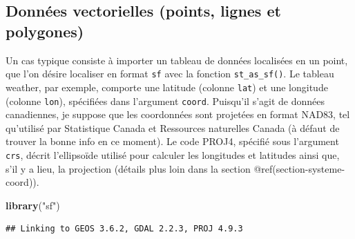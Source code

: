 \documentclass[]{book}
\newenvironment{Shaded}{\begin{snugshade}}{\end{snugshade}}
\newcommand{\DataTypeTok}[1]{\textcolor[rgb]{0.13,0.29,0.53}{#1}}
\newcommand{\KeywordTok}[1]{\textcolor[rgb]{0.13,0.29,0.53}{\textbf{#1}}}
\newcommand{\NormalTok}[1]{#1}
\newcommand{\OperatorTok}[1]{\textcolor[rgb]{0.81,0.36,0.00}{\textbf{#1}}}
\newcommand{\StringTok}[1]{\textcolor[rgb]{0.31,0.60,0.02}{#1}}
\begin{document}
\hypertarget{donnuxe9es-vectorielles-points-lignes-et-polygones}{%
\subsection{Données vectorielles (points, lignes et
polygones)}\label{donnuxe9es-vectorielles-points-lignes-et-polygones}}

Un cas typique consiste à importer un tableau de données localisées en
un point, que l'on désire localiser en format \texttt{sf} avec la
fonction \texttt{st\_as\_sf()}. Le tableau weather, par exemple,
comporte une latitude (colonne \texttt{lat}) et une longitude (colonne
\texttt{lon}), spécifiées dans l'argument \texttt{coord}. Puisqu'il
s'agit de données canadiennes, je suppose que les coordonnées sont
projetées en format NAD83, tel qu'utilisé par Statistique Canada et
Ressources naturelles Canada (à défaut de trouver la bonne info en ce
moment). Le code PROJ4, spécifié sous l'argument \texttt{crs}, décrit
l'ellipsoïde utilisé pour calculer les longitudes et latitudes ainsi
que, s'il y a lieu, la projection (détails plus loin dans la section
@ref(section-systeme-coord)).

\begin{Shaded}
\begin{Highlighting}[]
\KeywordTok{library}\NormalTok{(}\StringTok{"sf"}\NormalTok{)}
\end{Highlighting}
\end{Shaded}

\begin{verbatim}
## Linking to GEOS 3.6.2, GDAL 2.2.3, PROJ 4.9.3
\end{verbatim}

\begin{Shaded}
\end{Shaded}
\end{document}

